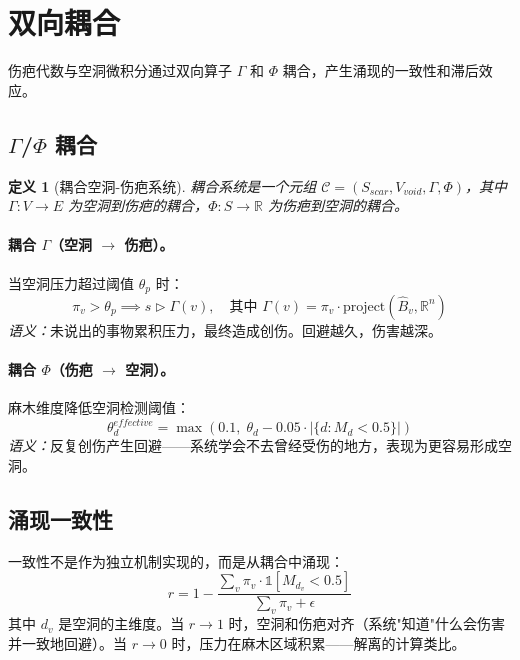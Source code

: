 \documentclass[11pt]{article}
\newtheorem{definition}[theorem]{定义}
\begin{document}
\section{双向耦合}
\label{sec:coupled}

伤疤代数与空洞微积分通过双向算子 $\Gamma$ 和 $\Phi$ 耦合，产生涌现的一致性和滞后效应。

\subsection{$\Gamma$/$\Phi$ 耦合}

\begin{definition}[耦合空洞-伤疤系统]
\label{def:coupled}
耦合系统是一个元组 $\mathcal{C} = (S_{scar}, V_{void}, \Gamma, \Phi)$，其中 $\Gamma: V \to E$ 为空洞到伤疤的耦合，$\Phi: S \to \mathbb{R}$ 为伤疤到空洞的耦合。
\end{definition}

\paragraph{耦合 $\Gamma$（空洞 $\to$ 伤疤）。}
当空洞压力超过阈值 $\theta_p$ 时：
\begin{equation}
\pi_v > \theta_p \implies s \triangleright \Gamma(v), \quad \text{其中 } \Gamma(v) = \pi_v \cdot \text{project}(\hat{B}_v, \mathbb{R}^n)
\end{equation}
\emph{语义：}未说出的事物累积压力，最终造成创伤。回避越久，伤害越深。

\paragraph{耦合 $\Phi$（伤疤 $\to$ 空洞）。}
麻木维度降低空洞检测阈值：
\begin{equation}
\theta_d^{effective} = \max\left(0.1,\; \theta_d - 0.05 \cdot |\{d : M_d < 0.5\}|\right)
\end{equation}
\emph{语义：}反复创伤产生回避——系统学会不去曾经受伤的地方，表现为更容易形成空洞。

\subsection{涌现一致性}

一致性不是作为独立机制实现的，而是从耦合中涌现：
\begin{equation}
\label{eq:coherence}
r = 1 - \frac{\sum_v \pi_v \cdot \mathbb{1}[M_{d_v} < 0.5]}{\sum_v \pi_v + \epsilon}
\end{equation}
其中 $d_v$ 是空洞的主维度。当 $r \to 1$ 时，空洞和伤疤对齐（系统"知道"什么会伤害并一致地回避）。当 $r \to 0$ 时，压力在麻木区域积累——解离的计算类比。
\end{document}
